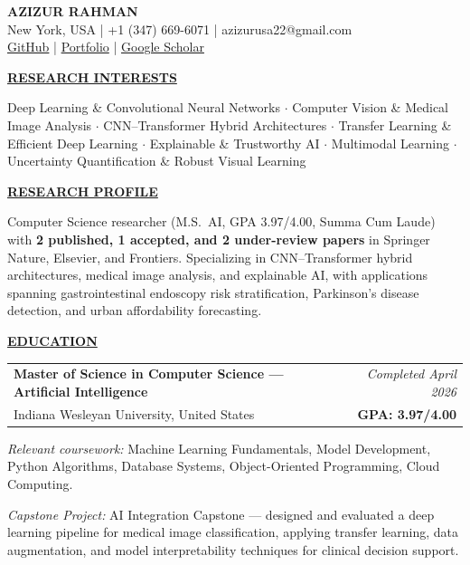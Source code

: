 \documentclass[10.5pt,letterpaper]{article}
\newcommand{\sectiontitle}[1]{\vspace{7pt}\noindent\underline{\textbf{#1}}\vspace{5pt}\par}
\begin{document}
\begin{center}
  {\large \bfseries AZIZUR RAHMAN} \\[2pt]
  New York, USA \; | \; +1 (347) 669-6071 \; | \; azizurusa22@gmail.com \\[1pt]
  \href{https://github.com/ayanchyaziz123}{GitHub} \; | \; \href{http://azizurrahman.netlify.app/}{Portfolio} \; | \; \href{https://scholar.google.com/citations?hl=en&user=ZybW6NMAAAAJ}{Google Scholar}
\end{center}

\sectiontitle{RESEARCH INTERESTS}
Deep Learning \& Convolutional Neural Networks $\cdot$ Computer Vision \& Medical Image Analysis $\cdot$ CNN--Transformer Hybrid Architectures $\cdot$ Transfer Learning \& Efficient Deep Learning $\cdot$ Explainable \& Trustworthy AI $\cdot$ Multimodal Learning $\cdot$ Uncertainty Quantification \& Robust Visual Learning

\sectiontitle{RESEARCH PROFILE}
Computer Science researcher (M.S.\ AI, GPA 3.97/4.00, Summa Cum Laude) with \textbf{2 published, 1 accepted, and 2 under-review papers} in Springer Nature, Elsevier, and Frontiers. Specializing in CNN--Transformer hybrid architectures, medical image analysis, and explainable AI, with applications spanning gastrointestinal endoscopy risk stratification, Parkinson's disease detection, and urban affordability forecasting.

\sectiontitle{EDUCATION}

\noindent
\begin{tabularx}{\linewidth}{@{}X r@{}}
  \textbf{Master of Science in Computer Science --- Artificial Intelligence} & \textit{Completed April 2026} \\
  Indiana Wesleyan University, United States & \textbf{GPA: 3.97/4.00}
\end{tabularx}

\vspace{3pt}
\textit{Relevant coursework:} Machine Learning Fundamentals, Model Development, Python Algorithms, Database Systems, Object-Oriented Programming, Cloud Computing.

\vspace{3pt}
\textit{Capstone Project:} AI Integration Capstone --- designed and evaluated a deep learning pipeline for medical image classification, applying transfer learning, data augmentation, and model interpretability techniques for clinical decision support.

\vspace{8pt}
\end{document}
